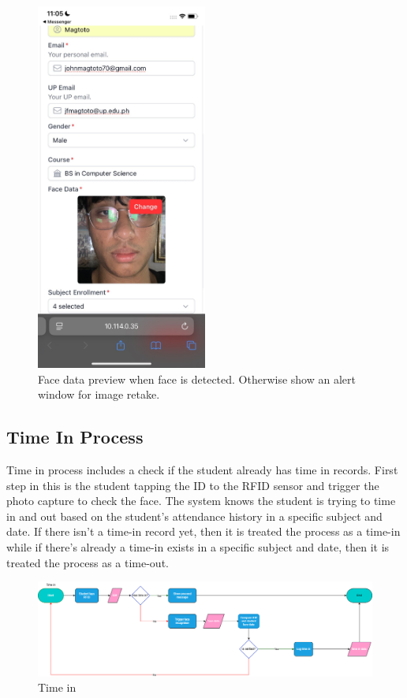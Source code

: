 \begin{figure}[h] %
	\centering
	\includegraphics[width=0.5\textwidth]{figures/chapter4/student_form_mobile_preview.jpg} %
	\caption{Face data preview when face is detected. Otherwise show an alert window for image retake.}
	\label{fig:student_form_mobile_preview}
\end{figure}
\clearpage
\subsection{Time In Process}
Time in process includes a check if the student already has time in records. First step in this is the student tapping the ID to the RFID sensor and trigger the photo capture to check the face. The system knows the student is trying to time in and out based on the student's attendance history in a specific subject and date. If there isn't a time-in record yet, then it is treated the process as a time-in while if there's already a time-in exists in a specific subject and date, then it is treated the process as a time-out. 
\begin{figure}[h] %
	\centering
	\includegraphics[width=1.0\textwidth]{figures/chapter4/Timein2.png} %
	\caption{Time in}
	\label{fig:timein}
\end{figure}

